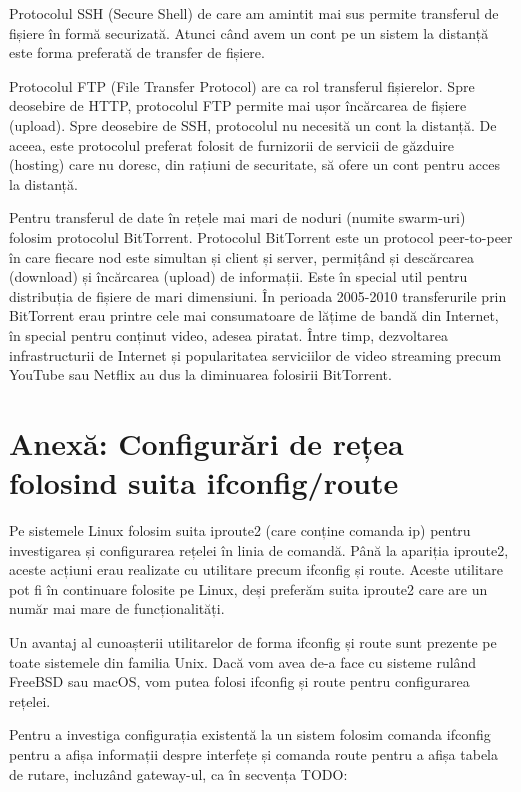 Protocolul SSH (Secure Shell) de care am amintit mai sus permite transferul de fișiere în formă securizată. Atunci când avem un cont pe un sistem la distanță este forma preferată de transfer de fișiere.

Protocolul FTP (File Transfer Protocol) are ca rol transferul fișierelor. Spre deosebire de HTTP, protocolul FTP permite mai ușor încărcarea de fișiere (upload). Spre deosebire de SSH, protocolul nu necesită un cont la distanță. De aceea, este protocolul preferat folosit de furnizorii de servicii de găzduire (hosting) care nu doresc, din rațiuni de securitate, să ofere un cont pentru acces la distanță.

Pentru transferul de date în rețele mai mari de noduri (numite swarm-uri) folosim protocolul BitTorrent. Protocolul BitTorrent este un protocol peer-to-peer în care fiecare nod este simultan și client și server, permițând și descărcarea (download) și încărcarea (upload) de informații. Este în special util pentru distribuția de fișiere de mari dimensiuni. În perioada 2005-2010 transferurile prin BitTorrent erau printre cele mai consumatoare de lățime de bandă din Internet, în special pentru conținut video, adesea piratat. Între timp, dezvoltarea infrastructurii de Internet și popularitatea serviciilor de video streaming precum YouTube sau Netflix au dus la diminuarea folosirii BitTorrent.


\section{Anexă: Configurări de rețea folosind suita ifconfig/route}
\label{sec:net:config-ifconfig}

Pe sistemele Linux folosim suita iproute2 (care conține comanda ip) pentru investigarea și configurarea rețelei în linia de comandă. Până la apariția iproute2, aceste acțiuni erau realizate cu utilitare precum ifconfig și route. Aceste utilitare pot fi în continuare folosite pe Linux, deși preferăm suita iproute2 care are un număr mai mare de funcționalități.

Un avantaj al cunoașterii utilitarelor de forma ifconfig și route sunt prezente pe toate sistemele din familia Unix. Dacă vom avea de-a face cu sisteme rulând FreeBSD sau macOS, vom putea folosi ifconfig și route pentru configurarea rețelei.

Pentru a investiga configurația existentă la un sistem folosim comanda ifconfig pentru a afișa informații despre interfețe și comanda route pentru a afișa tabela de rutare, incluzând gateway-ul, ca în secvența TODO:

